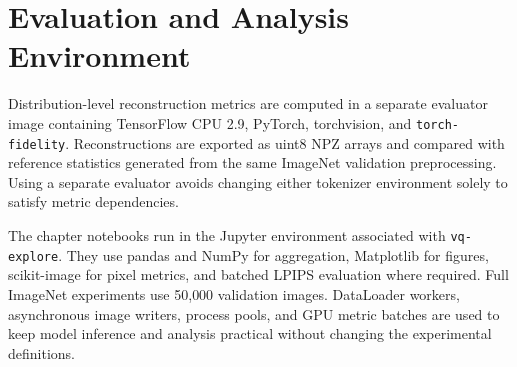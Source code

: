 \section{Evaluation and Analysis Environment}
\label{sec:appendix_evaluator_environment}

Distribution-level reconstruction metrics are computed in a separate
evaluator image containing TensorFlow CPU 2.9, PyTorch, torchvision, and
\texttt{torch-fidelity}. Reconstructions are exported as uint8 NPZ arrays and
compared with reference statistics generated from the same ImageNet validation
preprocessing. Using a separate evaluator avoids changing either tokenizer
environment solely to satisfy metric dependencies.

The chapter notebooks run in the Jupyter environment associated with
\texttt{vq-explore}. They use pandas and NumPy for aggregation, Matplotlib for
figures, scikit-image for pixel metrics, and batched LPIPS evaluation where
required. Full ImageNet experiments use 50{,}000 validation images. DataLoader
workers, asynchronous image writers, process pools, and GPU metric batches are
used to keep model inference and analysis practical without changing the
experimental definitions.
